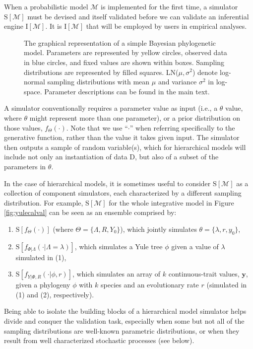 \documentclass[oneside]{article}
\begin{document}
When a probabilistic model $\mathcal{M}$ is implemented for the first time, a simulator $\text{S}[\mathcal{M}]$ must be devised and itself validated before we can validate an inferential engine $\text{I}[\mathcal{M}]$.
It is $\text{I}[\mathcal{M}]$ that will be employed by users in empirical analyses.
\begin{figure}
      
  \caption{The graphical representation of a simple Bayesian
    phylogenetic model.
    Parameters are represented by yellow circles, observed data
    in blue circles, and fixed values are shown within boxes.
    Sampling distributions are represented by filled squares.
    LN($\mu,\sigma^2$) denote log-normal sampling distributions
    with mean $\mu$ and variance $\sigma^2$ in log-space.
    Parameter descriptions can be found in the main text.
    }
  \label{fig:pgm}
\end{figure}
A simulator conventionally requires a parameter value as input (i.e., a $\theta$ value, where $\theta$ might represent more than one parameter), or a prior distribution on those values, $f_\Theta(\cdot)$. 
Note that we use ``$\cdot$'' when referring specifically to the generative function, rather than the value it takes given input.
The simulator then outputs a sample of random variable(s), which for hierarchical models will include not only an instantiation of data $\text{D}$, but also of a subset of the parameters in $\theta$.
 
In the case of hierarchical models, it is sometimes useful to consider $\text{S}[\mathcal{M}]$ as a collection of component simulators, each characterized by a different sampling distribution.
For example, $\text{S}[\mathcal{M}]$ for the whole integrative model in Figure \ref{fig:yulecalval} can be seen as an ensemble comprised by:
\begin{enumerate}
  \item $\text{S}[f_\Theta(\cdot)]$ (where $\Theta = \{\Lambda, R, Y_0\}$), which jointly simulates $\theta=\{\lambda,r,y_0\}$,
  \item $\text{S}[f_{\Phi|\Lambda}(\cdot|\Lambda=\lambda)]$, which simulates a Yule tree $\phi$ given a value of $\lambda$ simulated in (1),
  \item $\text{S}[f_{Y|\Phi,R}(\cdot|\phi,r)]$, which simulates an array of $k$ continuous-trait values, $\boldsymbol{y}$, given a phylogeny $\phi$ with $k$ species and an evolutionary rate $r$ (simulated in (1) and (2), respectively).
\end{enumerate}
Being able to isolate the building blocks of a hierarchical model simulator helps divide and conquer the validation task, especially when some but not all of the sampling distributions are well-known parametric distributions, or when they result from well characterized stochastic processes (see below).
\end{document}
